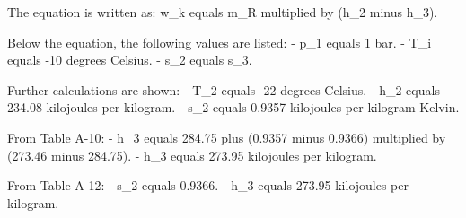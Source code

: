 The equation is written as:  
w_k equals m_R multiplied by (h_2 minus h_3).  

Below the equation, the following values are listed:  
- p_1 equals 1 bar.  
- T_i equals -10 degrees Celsius.  
- s_2 equals s_3.  

Further calculations are shown:  
- T_2 equals -22 degrees Celsius.  
- h_2 equals 234.08 kilojoules per kilogram.  
- s_2 equals 0.9357 kilojoules per kilogram Kelvin.  

From Table A-10:  
- h_3 equals 284.75 plus (0.9357 minus 0.9366) multiplied by (273.46 minus 284.75).  
- h_3 equals 273.95 kilojoules per kilogram.  

From Table A-12:  
- s_2 equals 0.9366.  
- h_3 equals 273.95 kilojoules per kilogram.